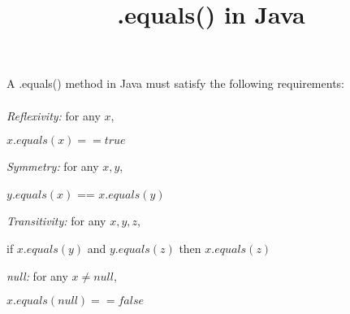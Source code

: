 \documentclass{article}
\begin{document}
\title{.equals() in Java}

\noindent
A .equals() method in Java must satisfy the following requirements: \\ \\

\noindent
\textit{Reflexivity:} for any $x$, 
    \begin{Large}\begin{center} $x.equals(x) == true$ \end{center}\end{Large}
\textit{Symmetry:}    for any $x,y$, 
    \begin{Large}\begin{center} $y.equals(x)$ == $x.equals(y)$ \end{center}\end{Large}
\textit{Transitivity:} for any $x,y,z$, 
    \begin{Large}\begin{center}if $x.equals(y)$ and $y.equals(z)$ then $x.equals(z)$ \end{center}\end{Large}
\textit{null:} for any $x \neq null$,
    \begin{Large}\begin{center} $x.equals(null) == false$ \end{center}\end{Large}
\end{document}

